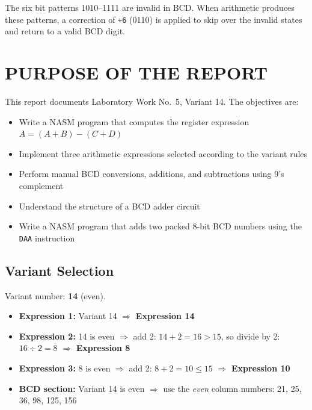 \documentclass[12pt,a4paper]{article}
\begin{document}
The six bit patterns 1010--1111 are invalid in BCD. When arithmetic produces these
patterns, a correction of \texttt{+6} (0110) is applied to skip over the invalid states
and return to a valid BCD digit.

\section{PURPOSE OF THE REPORT}

This report documents Laboratory Work No.\ 5, Variant 14.  The objectives are:

\begin{itemize}
    \renewcommand{\labelitemi}{--}
    \item Write a NASM program that computes the register expression $A = (A+B)-(C+D)$
    \item Implement three arithmetic expressions selected according to the variant rules
    \item Perform manual BCD conversions, additions, and subtractions using 9's complement
    \item Understand the structure of a BCD adder circuit
    \item Write a NASM program that adds two packed 8-bit BCD numbers using the \texttt{DAA}
    instruction
\end{itemize}

\subsection{Variant Selection}

Variant number: \textbf{14} (even).

\begin{itemize}
    \renewcommand{\labelitemi}{--}
    \item \textbf{Expression 1:} Variant 14 $\Rightarrow$ \textbf{Expression 14}
    \item \textbf{Expression 2:} 14 is even $\Rightarrow$ add 2: $14+2 = 16 > 15$, so
    divide by 2: $16 \div 2 = 8$ $\Rightarrow$ \textbf{Expression 8}
    \item \textbf{Expression 3:} 8 is even $\Rightarrow$ add 2: $8+2 = 10 \leq 15$
    $\Rightarrow$ \textbf{Expression 10}
    \item \textbf{BCD section:} Variant 14 is even $\Rightarrow$ use the \emph{even}
    column numbers: 21, 25, 36, 98, 125, 156
\end{itemize}
\end{document}
